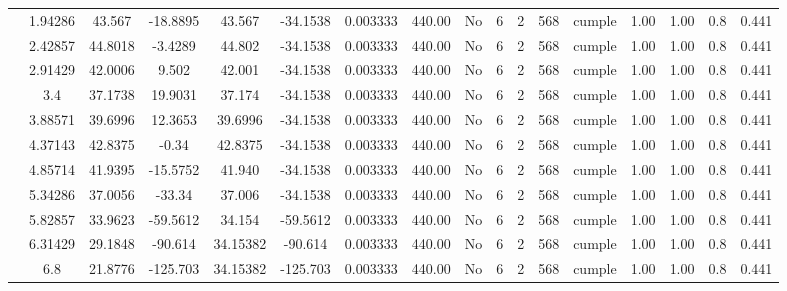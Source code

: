 \begin{table}[H]
{\begin{tabular}{|c|c|c|c|c|c|c|c|c|c|c|c|c|c|c|c|c|}
\cline{2-17}    & 1.94286 & 43.567 & -18.8895 & 43.567 & -34.1538 & 0.003333 & 440.00 & No  & 6   & 2   & 568 & \cellcolor[rgb]{ .776,  .937,  .808}cumple & 1.00 & 1.00 & 0.8 & 0.441 \bigstrut\\
\cline{2-17}    & 2.42857 & 44.8018 & -3.4289 & 44.802 & -34.1538 & 0.003333 & 440.00 & No  & 6   & 2   & 568 & \cellcolor[rgb]{ .776,  .937,  .808}cumple & 1.00 & 1.00 & 0.8 & 0.441 \bigstrut\\
\cline{2-17}    & 2.91429 & 42.0006 & 9.502 & 42.001 & -34.1538 & 0.003333 & 440.00 & No  & 6   & 2   & 568 & \cellcolor[rgb]{ .776,  .937,  .808}cumple & 1.00 & 1.00 & 0.8 & 0.441 \bigstrut\\
\cline{2-17}    & 3.4 & 37.1738 & 19.9031 & 37.174 & -34.1538 & 0.003333 & 440.00 & No  & 6   & 2   & 568 & \cellcolor[rgb]{ .776,  .937,  .808}cumple & 1.00 & 1.00 & 0.8 & 0.441 \bigstrut\\
\cline{2-17}    & 3.88571 & 39.6996 & 12.3653 & 39.6996 & -34.1538 & 0.003333 & 440.00 & No  & 6   & 2   & 568 & \cellcolor[rgb]{ .776,  .937,  .808}cumple & 1.00 & 1.00 & 0.8 & 0.441 \bigstrut\\
\cline{2-17}    & 4.37143 & 42.8375 & -0.34 & 42.8375 & -34.1538 & 0.003333 & 440.00 & No  & 6   & 2   & 568 & \cellcolor[rgb]{ .776,  .937,  .808}cumple & 1.00 & 1.00 & 0.8 & 0.441 \bigstrut\\
\cline{2-17}    & 4.85714 & 41.9395 & -15.5752 & 41.940 & -34.1538 & 0.003333 & 440.00 & No  & 6   & 2   & 568 & \cellcolor[rgb]{ .776,  .937,  .808}cumple & 1.00 & 1.00 & 0.8 & 0.441 \bigstrut\\
\cline{2-17}    & 5.34286 & 37.0056 & -33.34 & 37.006 & -34.1538 & 0.003333 & 440.00 & No  & 6   & 2   & 568 & \cellcolor[rgb]{ .776,  .937,  .808}cumple & 1.00 & 1.00 & 0.8 & 0.441 \bigstrut\\
\cline{2-17}    & 5.82857 & 33.9623 & -59.5612 & 34.154 & -59.5612 & 0.003333 & 440.00 & No  & 6   & 2   & 568 & \cellcolor[rgb]{ .776,  .937,  .808}cumple & 1.00 & 1.00 & 0.8 & 0.441 \bigstrut\\
\cline{2-17}    & 6.31429 & 29.1848 & -90.614 & 34.15382 & -90.614 & 0.003333 & 440.00 & No  & 6   & 2   & 568 & \cellcolor[rgb]{ .776,  .937,  .808}cumple & 1.00 & 1.00 & 0.8 & 0.441 \bigstrut\\
\cline{2-17}    & \cellcolor[rgb]{ .851,  .882,  .949}6.8 & 21.8776 & -125.703 & 34.15382 & -125.703 & 0.003333 & 440.00 & No  & 6   & 2   & 568 & \cellcolor[rgb]{ .776,  .937,  .808}cumple & 1.00 & 1.00 & 0.8 & 0.441 \bigstrut\\

\end{tabular}}
\end{table}
